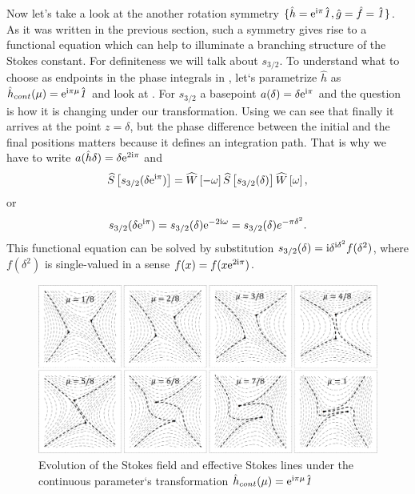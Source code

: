 \documentclass[12pt]{iopart}
\def\S{\widehat{S}}
\def\W{\widehat{W}}
\def\f{\hat{f}}
\def\g{\hat{g}}
\def\h{\hat{h}}
\def\unity{\hat{\it 1}}
\def\w{\omega}
\begin{document}
Now let's take a look at the another rotation symmetry $\{\h=\rme^{\rmi\pi}\unity,\g=\f=\unity\}$. 
As it was written in the previous section, such a symmetry gives rise to a functional 
equation which can help to illuminate a branching structure of the Stokes constant. 
For definiteness we will talk about $s_{3/2}$. To understand what to choose as endpoints 
in the phase integrals in , let`s parametrize $\h$ as $\h_{cont}(\mu)=\rme^{\rmi\pi\mu}\unity$ 
and look at . For $s_{3/2}$ a basepoint $a(\delta)=\delta \mathrm{e}^{\mathrm{i}\pi}$ 
and the question is how it is changing under our transformation. Using  
we can see that finally it arrives at the point $z=\delta$, but the phase difference between the
initial and the final positions matters because it defines an integration path.
That is why we have to write $a(\h\delta)=\delta \rme^{2\rmi\pi}$ and
\begin{eqnarray}
\S \left[ s_{3/2}(\delta \rme^{\rmi\pi}) \right] = 
\W \left[- \w \right]
\S \left[ s_{3/2} (\delta) \right]
\W \left[  \w \right],
\end{eqnarray}
or
\begin{eqnarray}
s_{3/2}(\delta \rme^{\rmi\pi})=s_{3/2}(\delta)\rme^{-2\rmi \w}=s_{3/2}(\delta)e^{-\pi\delta^2}.
\label{eq:websym_2}
\end{eqnarray}
This functional equation can be solved by substitution 
$s_{3/2}(\delta)=\mathrm{i}\delta^{\mathrm{i}\delta^2}f(\delta^2)$, where $f(\delta^2)$
is single-valued in a sense $f(x)=f(x \mathrm{e}^{2\mathrm{i}\pi})$.

\begin{figure}
\centering
\noindent
\includegraphics[width=\textwidth]{stuff/wrs.png}
\caption{Evolution of the Stokes field and effective Stokes lines 
under the continuous parameter`s transformation $\h_{cont}(\mu)=\rme^{\rmi\pi\mu}\unity$}
\label{fig:webrs}
\end{figure} 
\end{document}
